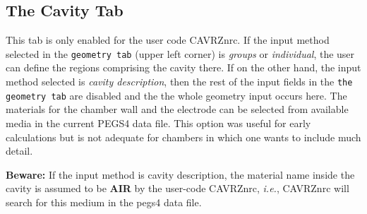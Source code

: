 \documentclass[12pt,twoside]{article}   %
\newcommand{\ie}{{\em i.e.}}
\begin{document}
\newpage
\subsection{The Cavity Tab}

This tab is only enabled for the user code CAVRZnrc. If the input method selected in the
{\tt geometry tab} (upper left corner) is {\em groups} or {\em individual}, the user can
define the regions comprising the cavity there. If on the other hand, the input method selected
is {\em cavity description}, then the rest of the input fields in the {\tt the geometry tab}
are disabled and the the whole geometry input occurs here. The materials for the chamber wall
and the electrode can be selected from available media in the current PEGS4 data file.
This option was useful for early calculations but is not adequate for chambers in which one
wants to include much detail.

{\bf Beware:} If the input method is cavity description, the material name inside the cavity is
assumed to be {\bf AIR} by the user-code CAVRZnrc, \ie, CAVRZnrc will search for this medium in
the pegs4 data file. \\ \\
\end{document}
